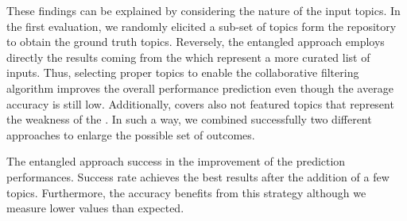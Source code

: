 These findings can be explained by considering the nature of the input topics. In the first \CT evaluation, we randomly elicited a sub-set of topics form the repository to obtain the ground truth topics. Reversely, the entangled approach employs directly the results coming from the \MNB which represent a more curated list of inputs. Thus, selecting proper topics to enable the collaborative filtering algorithm improves the overall performance prediction even though the average accuracy is still low. Additionally, \CT covers also not featured topics that represent the weakness of the \MNB. In such a way, we combined successfully two different approaches to enlarge the possible set of outcomes. 



\begin{tcolorbox}[boxrule=0.86pt,left=0.3em, right=0.3em,top=0.1em, bottom=0.05em]
The entangled approach success in the improvement of the prediction performances. Success rate achieves the best results after the addition of a few topics. Furthermore, the accuracy benefits from this strategy although we measure lower values than expected.
\end{tcolorbox}









